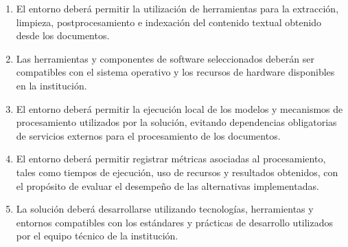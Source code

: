 \begin{enumerate}

    \item[\textbf{RA-S01}] El entorno deberá permitir la utilización de herramientas para la extracción, limpieza, postprocesamiento e indexación del contenido textual obtenido desde los documentos.

    \item[\textbf{RA-S02}] Las herramientas y componentes de software seleccionados deberán ser compatibles con el sistema operativo y los recursos de hardware disponibles en la institución.

    \item[\textbf{RA-S03}] El entorno deberá permitir la ejecución local de los modelos y mecanismos de procesamiento utilizados por la solución, evitando dependencias obligatorias de servicios externos para el procesamiento de los documentos.

    \item[\textbf{RA-S04}] El entorno deberá permitir registrar métricas asociadas al procesamiento, tales como tiempos de ejecución, uso de recursos y resultados obtenidos, con el propósito de evaluar el desempeño de las alternativas implementadas.

    \item[\textbf{RA-S05}] La solución deberá desarrollarse utilizando tecnologías, herramientas y entornos compatibles con los estándares y prácticas de desarrollo utilizados por el equipo técnico de la institución.

\end{enumerate}
